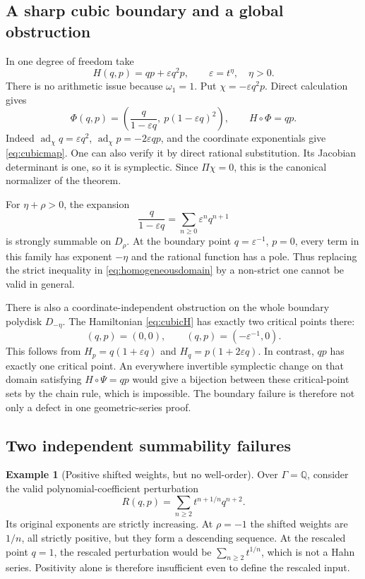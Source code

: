 \documentclass[11pt,letterpaper]{article}
\numberwithin{equation}{section}
\theoremstyle{definition}
\newtheorem{example}[theorem]{Example}
\theoremstyle{remark}
\newcommand{\Q}{\mathbb Q}
\newcommand{\ad}{\operatorname{ad}}
\begin{document}
\subsection{A sharp cubic boundary and a global obstruction}
In one degree of freedom take
\begin{equation}\label{eq:cubicH}
 H(q,p)=qp+\varepsilon q^2p,\qquad \varepsilon=t^\eta,\quad\eta>0.
\end{equation}
There is no arithmetic issue because $\omega_1=1$. Put
$\chi=-\varepsilon q^2p$. Direct calculation gives
\begin{equation}\label{eq:cubicmap}
 \Phi(q,p)=\left(\frac{q}{1-\varepsilon q},\ p(1-\varepsilon q)^2\right),
 \qquad H\circ\Phi=qp.
\end{equation}
Indeed $\ad_\chi q=\varepsilon q^2$,
$\ad_\chi p=-2\varepsilon qp$, and the coordinate exponentials give
\eqref{eq:cubicmap}. One can also verify it by direct rational substitution.
Its Jacobian determinant is one, so it is symplectic. Since
$\Pi\chi=0$, this is the canonical normalizer of the theorem.

For $\eta+\rho>0$, the expansion
\[
 \frac{q}{1-\varepsilon q}=\sum_{n\ge0}\varepsilon^n q^{n+1}
\]
is strongly summable on $D_\rho$. At the boundary point
$q=\varepsilon^{-1}$, $p=0$, every term in this family has exponent
$-\eta$ and the rational function has a pole. Thus replacing the strict
inequality in \eqref{eq:homogeneousdomain} by a non-strict one cannot be
valid in general.

There is also a coordinate-independent obstruction on the whole boundary
polydisk $D_{-\eta}$. The Hamiltonian \eqref{eq:cubicH} has exactly two
critical points there:
\[
 (q,p)=(0,0),\qquad(q,p)=(-\varepsilon^{-1},0).
\]
This follows from $H_p=q(1+\varepsilon q)$ and
$H_q=p(1+2\varepsilon q)$. In contrast, $qp$ has exactly one critical
point. An everywhere invertible symplectic change on that domain satisfying
$H\circ\Psi=qp$ would give a bijection between these critical-point sets by
the chain rule, which is impossible. The boundary failure is therefore not
only a defect in one geometric-series proof.

\subsection{Two independent summability failures}
\begin{example}[Positive shifted weights, but no well-order]
\label{ex:badorder}
Over $\Gamma=\Q$, consider the valid polynomial-coefficient perturbation
\[
 R(q,p)=\sum_{n\ge2}t^{n+1/n}q^{n+2}.
\]
Its original exponents are strictly increasing. At $\rho=-1$ the shifted
weights are $1/n$, all strictly positive, but they form a descending
sequence. At the rescaled point $q=1$, the rescaled perturbation would be
$\sum_{n\ge2}t^{1/n}$, which is not a Hahn series. Positivity alone is
therefore insufficient even to define the rescaled input.
\end{example}
\end{document}
